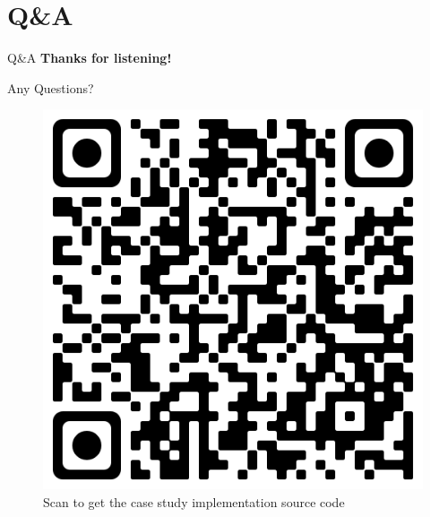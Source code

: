 \documentclass{beamer}
\begin{document}
\section{Q\&A}
\begin{frame}{Q\&A}
\centering
\huge{\textbf{Thanks for listening!}}

Any Questions?
\begin{figure}[t!]
  \begin{center}
    \includegraphics[scale=0.075]{slide/img/source.png}
    \caption{Scan to get the case study implementation source code}
    \label{fig:source}
  \end{center}
\end{figure}
\end{frame}
\end{document}
